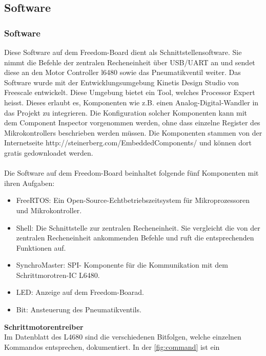     \subsection{Software}   \label{ch:Software} 
    \fi
    \ifEMBED
    \subsubsection{Software} \label{ch:Softwarea}
    \fi
    Diese Software auf dem Freedom-Board dient als Schnittstellensoftware. Sie 
    nimmt die Befehle der zentralen Recheneinheit über USB/UART an und sendet 
    diese an den Motor Controller l6480 sowie das Pneumatikventil weiter. Das 
    Software wurde mit der Entwicklungsumgebung Kinetis Design Studio von 
    Freescale entwickelt. Diese Umgebung bietet ein Tool, welches Processor 
    Expert heisst. Dieses erlaubt es, Komponenten wie z.B. einen 
    Analog-Digital-Wandler in das Projekt zu integrieren. Die Konfiguration 
    solcher Komponenten kann mit dem Component Inspector vorgenommen werden, 
    ohne dass einzelne Register des Mikrokontrollers beschrieben werden 
    müssen. Die Komponenten stammen von der Internetseite 
    http://steinerberg.com/EmbeddedComponents/ und können dort gratis 
    gedownloadet werden.
    \\\\
    Die Software auf dem Freedom-Board beinhaltet folgende fünf Komponenten 
    mit ihren Aufgaben: 
    \begin{itemize}
        \item FreeRTOS:         Ein Open-Source-Echtbetriebszeitsystem für 
            Mikroprozessoren und Mikrokontroller.  
        \item Shell:            Die Schnittstelle zur zentralen Recheneinheit. 
            Sie vergleicht die von der zentralen Recheneinheit ankommenden 
            Befehle und ruft die entsprechenden Funktionen auf. 
        \item SynchroMaster:    SPI- Komponente für die Kommunikation mit dem 
            Schrittmorotren-IC L6480. 
        \item LED:              Anzeige auf dem Freedom-Boarad.
        \item Bit:              Ansteuerung des Pneumatikventils.
    \end{itemize}
    \textbf{Schrittmotorentreiber}\\
    Im Datenblatt des L4680 sind die verschiedenen Bitfolgen, welche einzelnen 
    Kommandos entsprechen, dokumentiert. In der \autoref{fig:command} ist ein 
